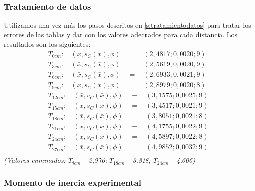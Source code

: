 \documentclass[12pt, a4paper, titlepage]{article}
\begin{document}
  \subsubsection{Tratamiento de datos}

  Utilizamos una vez más los pasos descritos en \ref{s:tratamientodatos} para tratar los errores de las tablas y dar con los valores adecuados para cada distancia. Los resultados son los siguientes:
  \begin{gather*}
    T_{0cm}: \quad (\bar{x}, s_C(\bar{x}), \phi) \quad = \quad ( 2,4817; 0,0020; 9) \\
    T_{3cm}: \quad (\bar{x}, s_C(\bar{x}), \phi) \quad = \quad ( 2,5619; 0,0020; 9) \\
    T_{6cm}: \quad (\bar{x}, s_C(\bar{x}), \phi) \quad = \quad ( 2,6933; 0,0021; 9) \\
    T_{9cm}: \quad (\bar{x}, s_C(\bar{x}), \phi) \quad = \quad ( 2,8979; 0,0020; 8) \\
    T_{12cm}: \quad (\bar{x}, s_C(\bar{x}), \phi) \quad = \quad ( 3,1575; 0,0025; 9) \\
    T_{15cm}: \quad (\bar{x}, s_C(\bar{x}), \phi) \quad = \quad ( 3,4517; 0,0021; 9) \\
    T_{18cm}: \quad (\bar{x}, s_C(\bar{x}), \phi) \quad = \quad ( 3,8051; 0,0021; 8) \\
    T_{21cm}: \quad (\bar{x}, s_C(\bar{x}), \phi) \quad = \quad ( 4,1755; 0,0022; 9) \\
    T_{24cm}: \quad (\bar{x}, s_C(\bar{x}), \phi) \quad = \quad ( 4,5897; 0,0022; 8) \\
    T_{27cm}: \quad (\bar{x}, s_C(\bar{x}), \phi) \quad = \quad ( 4,9852; 0,0032; 9) \\
  \end{gather*}
  \textit{(Valores eliminados: $T_{9cm}$ - 2,976; $T_{18cm}$ - 3,818; $T_{24cm}$ - 4,606)}

  \subsubsection{Momento de inercia experimental}
\end{document}
